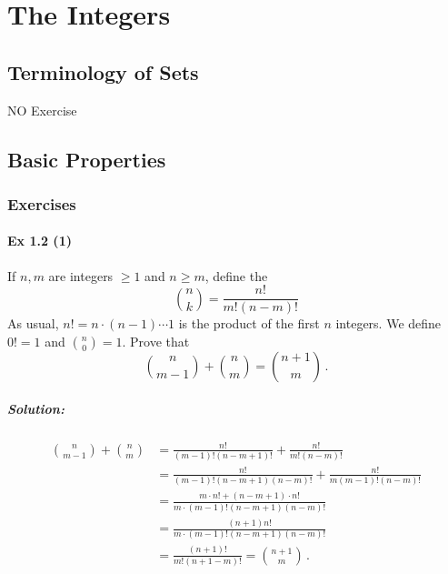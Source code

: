 \setcounter{chapter}{0}
\renewcommand{\thechapter}{1}
\chapter{The Integers}\label{ch:1}
\setcounter{equation}{0}	        %

\section{Terminology of Sets}\label{sec:1.1}	%
	NO Exercise

\newpage		%

\section{Basic Properties}\label{sec:1.2}	
\subsection*{Exercises}\label{sec:1.2_Exercises}

\subsubsection{Ex 1.2 (1)}\label{sec:Ex_1.2.1}

If $n, m$ are integers $\geq 1$ and $n \geq m$, define the 
$$ \binom{n}{k} = \frac{n!}{m! (n-m)!} $$
As usual, $n! = n \cdot (n-1) \cdots 1$ is the product of the first $n$ integers. We define $0! = 1$ and 
$\binom{n}{0} = 1$. Prove that 
$$
\binom{n}{m-1} + \binom{n}{m} = \binom{n+1}{m}\,.
$$

%
\paragraph{Solution:}{

\begin{align*}
    \binom{n}{m-1} + \binom{n}{m} &= \frac{n!}{(m-1)!(n-m+1)!} +  \frac{n!}{m!(n-m)!}\\
	&= \frac{n!}{ (m-1)! (n-m+1)(n-m)!} + \frac{n!}{m (m-1)!(n-m)!} \\  
	&= \frac{m \cdot n!  +   (n - m + 1) \cdot n!}{ m \cdot (m-1)! (n-m+1)(n-m)!} \\  
	&= \frac{(n+1) n!}{ m \cdot (m-1)! (n-m+1)(n-m)!} \\  	        
    &= \frac{(n+1)!}{ m! (n+1-m)!} = \binom{n+1}{m}\,.
\end{align*}

}

